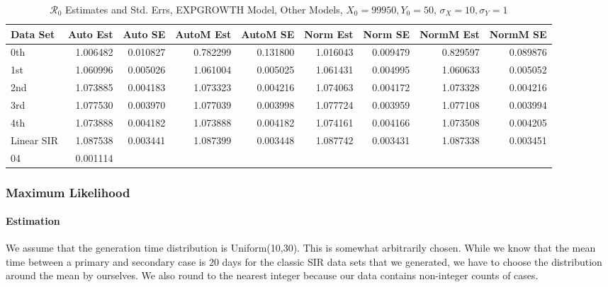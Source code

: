 \documentclass[12pt]{article}
\newcommand{\rr}{\ensuremath{\mathcal{R}_0}}
\begin{document}
\begin{table}[H]
	
	\caption{$\rr$ Estimates and Std. Errs, EXPGROWTH Model,
		Other Models, $X_0 = 99950, Y_0 = 50$, 
		$\sigma_X = 10, \sigma_Y = 1$}
	\begin{footnotesize}
		\hskip -1cm
		\begin{tabular}{l|r|r|r|r|r|r|r|r}
			\hline
			Data Set & Auto Est & Auto SE & AutoM Est & AutoM SE & Norm Est & Norm SE & NormM Est & NormM SE\\
			\hline
			0th & 1.006482 & 0.010827 & 0.782299 & 0.131800 & 1.016043 & 0.009479 & 0.829597 & 0.089876\\
			\hline
			1st & 1.060996 & 0.005026 & 1.061004 & 0.005025 & 1.061431 & 0.004995 & 1.060633 & 0.005052\\
			\hline
			2nd & 1.073885 & 0.004183 & 1.073323 & 0.004216 & 1.074063 & 0.004172 & 1.073328 & 0.004216\\
			\hline
			3rd & 1.077530 & 0.003970 & 1.077039 & 0.003998 & 1.077724 & 0.003959 & 1.077108 & 0.003994\\
			\hline
			4th & 1.073888 & 0.004182 & 1.073888 & 0.004182 & 1.074161 & 0.004166 & 1.073508 & 0.004205\\
			\hline
			Linear SIR & 1.087538 & 0.003441 & 1.087399 & 0.003448 & 1.087742 & 0.003431 & 1.087338 & 0.003451\\
			\hline04 & 0.001114\\
			\hline
		\end{tabular}
	\end{footnotesize}
\end{table}

\subsubsection{Maximum Likelihood}

\paragraph{Estimation}

We assume that the generation time distribution is Uniform(10,30). This is somewhat arbitrarily chosen. While we know that the mean time between a primary and secondary case is 20 days for the classic SIR data sets that we generated, we have to choose the distribution around the mean by ourselves. We also round to the nearest integer because our data contains non-integer counts of cases.
\end{document}
